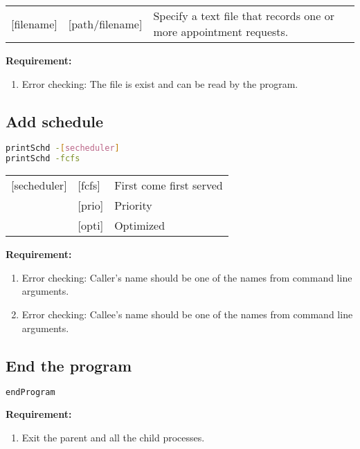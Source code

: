 \documentclass[12pt,a4paper]{report}
\begin{document}
\begin{table}[h]
\begin{tabular}{lll}
{[}filename{]} & {[}path/filename{]} & Specify a text file that records one or more appointment requests.
\end{tabular}
\end{table}

\textbf{Requirement:}
\begin{enumerate}
\item Error checking: The file is exist and can be read by the program.
\end{enumerate}

\subsection{Add schedule}
\begin{lstlisting}[language=bash,basicstyle=\ttfamily,keywordstyle=\bfseries]
printSchd -[secheduler]
printSchd -fcfs
\end{lstlisting}

\begin{table}[h]
\begin{tabular}{lll}
{[}secheduler{]} & {[}fcfs{]} & First come first served \\
 & {[}prio{]} & Priority \\
 & {[}opti{]} & Optimized
\end{tabular}
\end{table}

\textbf{Requirement:}
\begin{enumerate}
\item Error checking: Caller's name should be one of the names from command line arguments.
\item Error checking: Callee's name should be one of the names from command line arguments.
\end{enumerate}

\subsection{End the program}
\begin{lstlisting}[language=bash,basicstyle=\ttfamily,keywordstyle=\bfseries]
endProgram
\end{lstlisting}

\textbf{Requirement:}
\begin{enumerate}
\item Exit the parent and all the child processes.
\end{enumerate}
\end{document}
